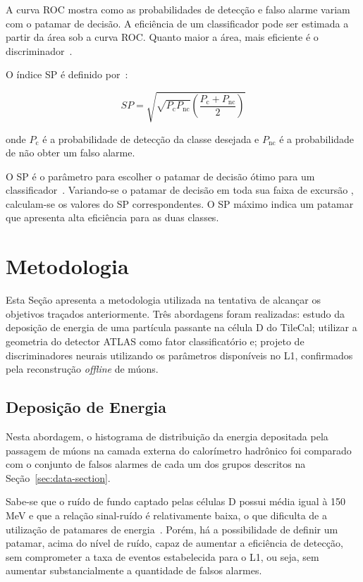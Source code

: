 A curva ROC mostra como as probabilidades de detecção e falso alarme variam com
o patamar de decisão. A eficiência de um classificador pode ser estimada a
partir da área sob a curva ROC. Quanto maior a área, mais eficiente é o
discriminador~\cite{ref:SIMAS}.

O índice SP é definido por~\cite{CIODARO2012}:

\begin{equation}
SP = \sqrt{\sqrt{P_{\text{c}}P_{\text{nc}}} \left(\frac{P_{\text{c}} +
P_{\text{nc}}}{2}\right)}
\end{equation}

onde $P_\text{c}$ é a probabilidade de detecção da classe desejada e
$P_{\text{nc}}$ é a probabilidade de não obter um falso alarme.

O SP é  o parâmetro para escolher o patamar de decisão ótimo para um
classificador~\cite{ref:SIMAS}. Variando-se o patamar de decisão em toda sua
faixa de excursão , calculam-se os valores do SP correspondentes. O SP máximo
indica um patamar que apresenta alta eficiência para as duas classes.

\section{Metodologia}

Esta Seção apresenta a metodologia utilizada na tentativa de alcançar os
objetivos traçados anteriormente. Três abordagens foram realizadas: estudo da
deposição de energia de uma partícula passante na célula D do TileCal; utilizar
a geometria do detector ATLAS como fator classificatório e; projeto de
discriminadores neurais utilizando os parâmetros disponíveis no L1, confirmados
pela reconstrução \emph{offline} de múons.

\subsection*{Deposição de Energia}

Nesta abordagem, o histograma de distribuição da energia depositada pela
passagem de múons na camada externa do calorímetro hadrônico foi comparado com o
conjunto de falsos alarmes de cada um dos grupos descritos na
Seção~\ref{sec:data-section}.

Sabe-se que o ruído de fundo captado pelas células D possui média igual à 150
MeV e que a relação sinal-ruído é relativamente baixa, o que dificulta de a
utilização de patamares de energia~\cite{CIODARO2009}. Porém, há a possibilidade
de definir um patamar, acima do nível de ruído, capaz de aumentar a eficiência
de detecção, sem comprometer a taxa de eventos estabelecida para o L1, ou seja,
sem aumentar substancialmente a quantidade de falsos alarmes.


